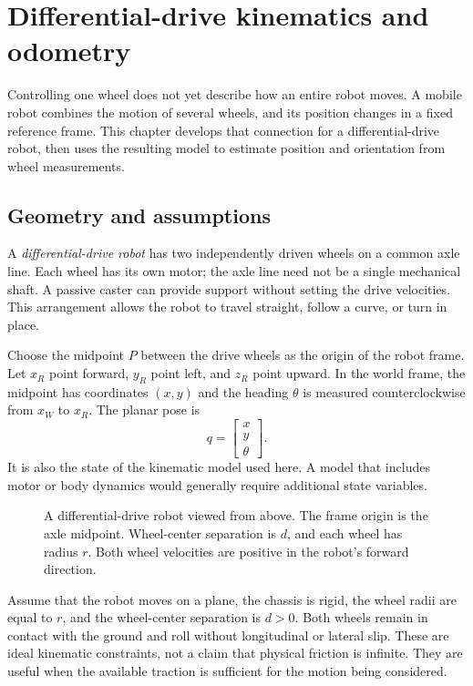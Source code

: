\chapter{Differential-drive kinematics and odometry}
\label{ch:odometry}

Controlling one wheel does not yet describe how an entire robot moves.
A mobile robot combines the motion of several wheels, and its position
changes in a fixed reference frame. This chapter develops that connection
for a differential-drive robot, then uses the resulting model to estimate
position and orientation from wheel measurements.

\section{Geometry and assumptions}
A \emph{differential-drive robot} has two independently driven wheels on
a common axle line. Each wheel has its own motor; the axle line need not
be a single mechanical shaft. A passive caster can provide support without
setting the drive velocities. This arrangement allows the robot to travel
straight, follow a curve, or turn in place.

Choose the midpoint $P$ between the drive wheels as the origin of the robot
frame. Let $x_R$ point forward, $y_R$ point left, and $z_R$ point upward.
In the world frame, the midpoint has coordinates $(x,y)$ and the heading
$\theta$ is measured counterclockwise from $x_W$ to $x_R$. The planar pose is
\begin{equation}
 q=\begin{bmatrix}x\\y\\\theta\end{bmatrix}.
 \label{eq:l09-pose}
\end{equation}
It is also the state of the kinematic model used here. A model that includes
motor or body dynamics would generally require additional state variables.

\begin{figure}[htbp]
\centering
\caption{A differential-drive robot viewed from above. The frame origin
is the axle midpoint. Wheel-center separation is $d$, and each wheel has
radius $r$. Both wheel velocities are positive in the robot's forward direction.}
\label{fig:l09-geometry}
\end{figure}

Assume that the robot moves on a plane, the chassis is rigid, the wheel
radii are equal to $r$, and the wheel-center separation is $d>0$. Both
wheels remain in contact with the ground and roll without longitudinal
or lateral slip. These are ideal kinematic constraints, not a claim that
physical friction is infinite. They are useful when the available traction
is sufficient for the motion being considered.

